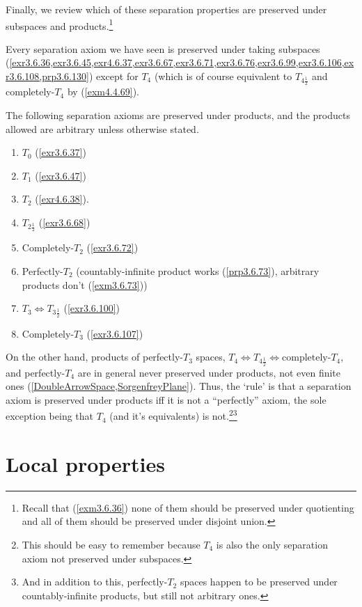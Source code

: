 Finally, we review which of these separation properties are preserved under subspaces and products.\footnote{Recall that (\cref{exm3.6.36}) none of them should be preserved under quotienting and all of them should be preserved under disjoint union.}

Every separation axiom we have seen is preserved under taking subspaces (\cref{exr3.6.36,exr3.6.45,exr4.6.37,exr3.6.67,exr3.6.71,exr3.6.76,exr3.6.99,exr3.6.106,exr3.6.108,prp3.6.130}) except for $T_4$ (which is of course equivalent to $T_{4\frac{1}{2}}$ and completely-$T_4$ by  (\cref{exm4.4.69}).

The following separation axioms are preserved under products, and the products allowed are arbitrary unless otherwise stated.
\begin{enumerate}
\item $T_0$ (\cref{exr3.6.37})
\item $T_1$ (\cref{exr3.6.47})
\item $T_2$ (\cref{exr4.6.38}).
\item $T_{2\frac{1}{2}}$ (\cref{exr3.6.68})
\item Completely-$T_2$ (\cref{exr3.6.72})
\item Perfectly-$T_2$ (countably-infinite product works (\cref{prp3.6.73}), arbitrary products don't (\cref{exm3.6.73}))
\item $T_3\Leftrightarrow T_{3\frac{1}{2}}$ (\cref{exr3.6.100})
\item Completely-$T_3$ (\cref{exr3.6.107})
\end{enumerate}
On the other hand, products of perfectly-$T_3$ spaces, $T_4\Leftrightarrow T_{4\frac{1}{2}}\Leftrightarrow \text{completely-}T_4$, and perfectly-$T_4$ are in general never preserved under products, not even finite ones (\cref{DoubleArrowSpace,SorgenfreyPlane}).  Thus, the `rule' is that a separation axiom is preserved under products iff it is not a ``perfectly'' axiom, the sole exception being that $T_4$ (and it's equivalents) is not.\footnote{This should be easy to remember because $T_4$ is also the only separation axiom not preserved under subspaces.}\footnote{And in addition to this, perfectly-$T_2$ spaces happen to be preserved under countably-infinite products, but still not arbitrary ones.}

\section{Local properties}

